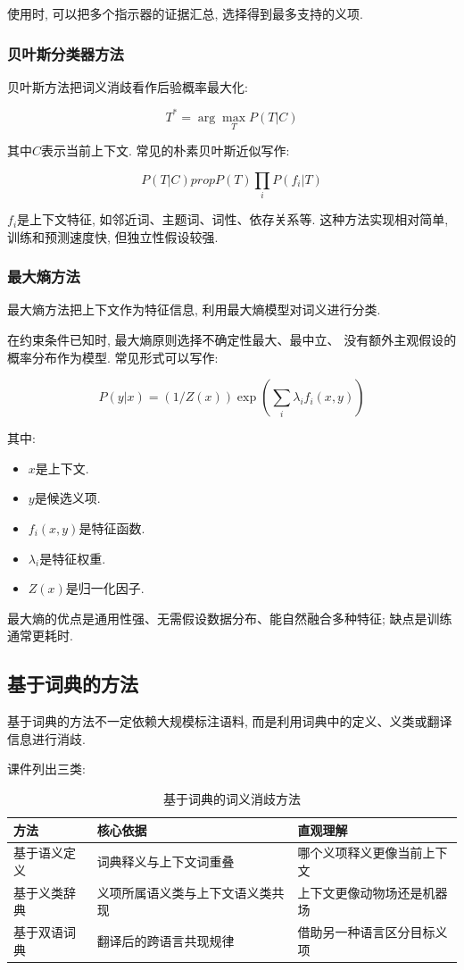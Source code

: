 使用时, 可以把多个指示器的证据汇总,
选择得到最多支持的义项.

\subsubsection{贝叶斯分类器方法}


贝叶斯方法把词义消歧看作后验概率最大化:

\[
T^* = \arg\max_T P(T | C)
\]

其中$C$表示当前上下文.
常见的朴素贝叶斯近似写作:

\[
P(T | C) prop P(T) \prod_i P(f_i | T)
\]

$f_i$是上下文特征, 如邻近词、主题词、词性、依存关系等.
这种方法实现相对简单, 训练和预测速度快, 但独立性假设较强.

\subsubsection{最大熵方法}


最大熵方法把上下文作为特征信息, 利用最大熵模型对词义进行分类.

在约束条件已知时, 最大熵原则选择不确定性最大、最中立、
没有额外主观假设的概率分布作为模型.
常见形式可以写作:

\[
P(y | x) = (1 / Z(x)) \exp(\sum_i \lambda_i f_i(x, y))
\]

其中:

\begin{itemize}
\item $x$是上下文.
\item $y$是候选义项.
\item $f_i(x,y)$是特征函数.
\item $\lambda_i$是特征权重.
\item $Z(x)$是归一化因子.
\end{itemize}

最大熵的优点是通用性强、无需假设数据分布、能自然融合多种特征;
缺点是训练通常更耗时.

\subsection{基于词典的方法}


基于词典的方法不一定依赖大规模标注语料,
而是利用词典中的定义、义类或翻译信息进行消歧.

课件列出三类:

\begin{table}[H]
\centering
\begingroup
\setlength{\tabcolsep}{2pt}
\small
\caption{基于词典的词义消歧方法}
\begin{tabular}{|p{}|p{}|p{}|}
\hline
方法 & 核心依据 & 直观理解 \\ \hline
基于语义定义 & 词典释义与上下文词重叠 & 哪个义项释义更像当前上下文 \\ \hline
基于义类辞典 & 义项所属语义类与上下文语义类共现 & 上下文更像动物场还是机器场 \\ \hline
基于双语词典 & 翻译后的跨语言共现规律 & 借助另一种语言区分目标义项 \\ \hline
\end{tabular}
\endgroup
\end{table}

